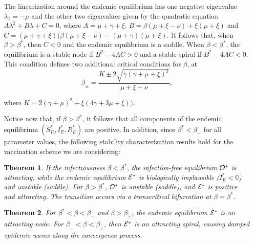 \documentclass[10pt]{article}
\newtheorem{thm}{Theorem}[section]
\begin{document}
The linearization around the endemic equilibrium has one negative eigenvalue $\lambda_1 = -\mu$ and the other two eigenvalues given by the quadratic equation $A\lambda^2 + B\lambda + C=0$, where $A=\mu+\gamma+\xi$, $B=\beta(\mu+\xi-\nu)+\xi(\mu+\xi)$ and $C=(\mu+\gamma+\xi)(\beta(\mu+\xi-\nu)-(\mu+\gamma)(\mu+\xi)$. It follows that, when $\beta>\beta^*$, then $C<0$ and the endemic equilibrium is a saddle. When $\beta<\beta^*$, the equilibrium is a stable node if $B^2-4AC>0$ and a stable spiral if $B^2-4AC<0$. This condition defines two additional critical conditions for $\beta$, at
$$\beta_{\pm} = \frac{K \pm 2\sqrt{\gamma(\gamma+\mu+\xi)^3}}{\mu+\xi-\nu},$$

\noindent where $K = 2(\gamma+\mu)^2 + \xi(4\gamma+3\mu+\xi))$. 

Notice now that, if $\beta>\beta^*$, it follows that all components of the endemic equilibrium $(S_E^*,I_E^*,R_E^*)$ are positive. In addition, since $\beta^*<\beta_{-}$ for all parameter values, the following stability characterization results hold for the vaccination scheme we are considering:

\begin{thm}
If the infectiousness $\beta< \beta^*$, the infection-free equilibrium ${\cal O}^*$ is attracting, while the endemic equilibrium ${\cal E}^*$ is biologically implausible ($I_E^*<0$) and unstable (saddle). For $\beta>\beta^*$, ${\cal O}^*$ is unstable (saddle), and ${\cal E}^*$ is positive and attracting. The transition occurs via a transcritical bifurcation at $\beta=\beta^*$.
\end{thm}

\begin{thm}
For $\beta^*<\beta<\beta_{-}$ and $\beta>\beta_{+}$, the endemic equilibrium ${\cal E}^*$ is an attracting node. For $\beta_{-}<\beta<\beta_{+}$, then ${\cal E}^*$ is an attracting spiral, causing damped epidemic waves along the convergence process.
\end{thm}
\end{document}
